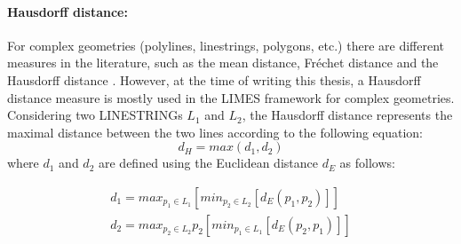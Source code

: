 \begin{figure}[ht!b]
\end{figure}


\paragraph{Hausdorff distance:}
For complex geometries (polylines, linestrings, polygons, etc.) there are different measures in the literature, such as the mean distance, Fr\'echet distance and the Hausdorff distance \cite{anamaria08}. However, at the time of writing this thesis, a Hausdorff distance measure is mostly used in the LIMES framework for complex geometries. Considering two LINESTRINGs $L_{1}$ and $L_{2}$, the Hausdorff distance represents the maximal distance between the two lines according to the following equation:
\begin{equation}
d_{H} = max(d_{1}, d_{2} )
\end{equation}
where $d_{1}$ and $d_{2}$ are defined using the Euclidean distance $d_{E}$ as follows:


\begin{align}
d_{1} = max_{p_{1} \in L_{1}}[min_{p_{2} \in L_{2}}[d_{E}(p_{1}, p_{2})]] \\
d_{2} = max_{p_{2} \in L_{2}}{p_{2}}[min_{p_{1} \in L_{1}}[d_{E}(p_{2}, p_{1})]]
\end{align}



